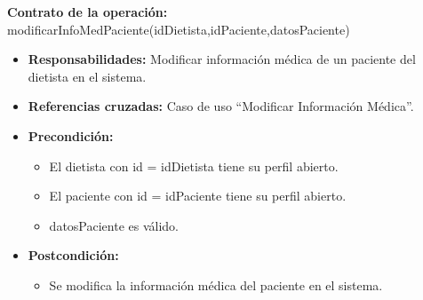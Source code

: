 \textbf{Contrato de la operación:} modificarInfoMedPaciente(idDietista,idPaciente,datosPaciente)
\begin{itemize}
\item \textbf{Responsabilidades:} Modificar información médica de un paciente del dietista en el sistema.
\item \textbf{Referencias cruzadas:} Caso de uso ``Modificar Información Médica''.
\item \textbf{Precondición:}
\begin{itemize}
\item El dietista con id = idDietista tiene su perfil abierto.
\item El paciente con id = idPaciente tiene su perfil abierto.
\item datosPaciente es válido.
\end{itemize}
\item \textbf{Postcondición:}
\begin{itemize}
\item Se modifica la información médica del paciente en el sistema.
\end{itemize}
\end{itemize}


